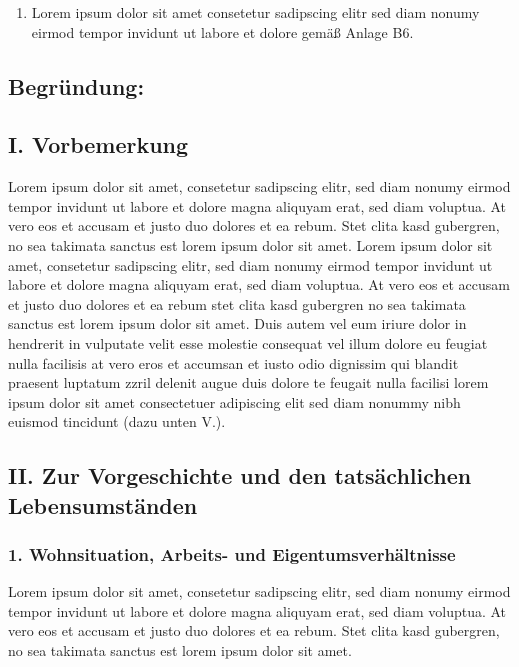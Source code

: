 \documentclass[
  11pt,
  a4paper,
]{article}
\providecommand{\tightlist}{%
  \setlength{\itemsep}{0pt}\setlength{\parskip}{0pt}}
\begin{document}
\begin{enumerate}
\def\labelenumi{\arabic{enumi}.}
\setcounter{enumi}{2}
\tightlist
\item
  Lorem ipsum dolor sit amet consetetur sadipscing elitr sed diam nonumy
  eirmod tempor invidunt ut labore et dolore gemäß Anlage B6.
\end{enumerate}

\subsection{Begründung:}\label{begruxfcndung}

\subsection{I. Vorbemerkung}\label{i.-vorbemerkung}

Lorem ipsum dolor sit amet, consetetur sadipscing elitr, sed diam nonumy
eirmod tempor invidunt ut labore et dolore magna aliquyam erat, sed diam
voluptua. At vero eos et accusam et justo duo dolores et ea rebum. Stet
clita kasd gubergren, no sea takimata sanctus est lorem ipsum dolor sit
amet. Lorem ipsum dolor sit amet, consetetur sadipscing elitr, sed diam
nonumy eirmod tempor invidunt ut labore et dolore magna aliquyam erat,
sed diam voluptua. At vero eos et accusam et justo duo dolores et ea
rebum stet clita kasd gubergren no sea takimata sanctus est lorem ipsum
dolor sit amet. Duis autem vel eum iriure dolor in hendrerit in
vulputate velit esse molestie consequat vel illum dolore eu feugiat
nulla facilisis at vero eros et accumsan et iusto odio dignissim qui
blandit praesent luptatum zzril delenit augue duis dolore te feugait
nulla facilisi lorem ipsum dolor sit amet consectetuer adipiscing elit
sed diam nonummy nibh euismod tincidunt (dazu unten V.).

\subsection{II. Zur Vorgeschichte und den tatsächlichen
Lebensumständen}\label{ii.-zur-vorgeschichte-und-den-tatsuxe4chlichen-lebensumstuxe4nden}

\subsubsection{1. Wohnsituation, Arbeits- und
Eigentumsverhältnisse}\label{wohnsituation-arbeits--und-eigentumsverhuxe4ltnisse}

Lorem ipsum dolor sit amet, consetetur sadipscing elitr, sed diam nonumy
eirmod tempor invidunt ut labore et dolore magna aliquyam erat, sed diam
voluptua. At vero eos et accusam et justo duo dolores et ea rebum. Stet
clita kasd gubergren, no sea takimata sanctus est lorem ipsum dolor sit
amet.
\end{document}
